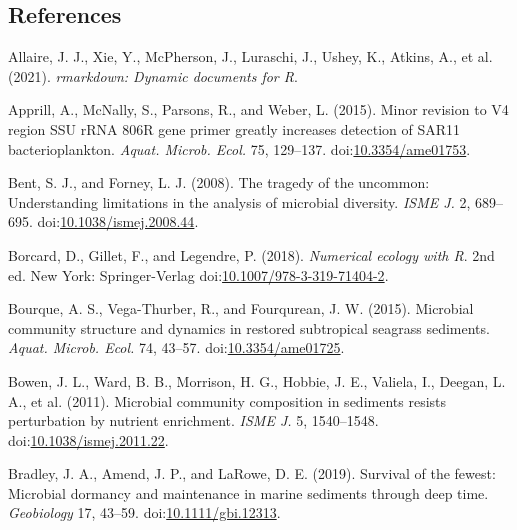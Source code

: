 \documentclass[12pt,]{article}
\begin{document}
\newpage

\newpage

\hypertarget{references}{%
\subsection{References}\label{references}}

 \setlength{\emergencystretch}{8.5em}

\hypertarget{refs}{}
\leavevmode\hypertarget{ref-Allaire2021}{}%
Allaire, J. J., Xie, Y., McPherson, J., Luraschi, J., Ushey, K., Atkins,
A., et al. (2021). \emph{rmarkdown: Dynamic documents for R}.

\leavevmode\hypertarget{ref-Apprill2015a}{}%
Apprill, A., McNally, S., Parsons, R., and Weber, L. (2015). Minor
revision to V4 region SSU rRNA 806R gene primer greatly increases
detection of SAR11 bacterioplankton. \emph{Aquat. Microb. Ecol.} 75,
129--137. doi:\href{https://doi.org/10.3354/ame01753}{10.3354/ame01753}.

\leavevmode\hypertarget{ref-Bent2008}{}%
Bent, S. J., and Forney, L. J. (2008). The tragedy of the uncommon:
Understanding limitations in the analysis of microbial diversity.
\emph{ISME J.} 2, 689--695.
doi:\href{https://doi.org/10.1038/ismej.2008.44}{10.1038/ismej.2008.44}.

\leavevmode\hypertarget{ref-Borcard2018}{}%
Borcard, D., Gillet, F., and Legendre, P. (2018). \emph{Numerical
ecology with R}. 2nd ed. New York: Springer-Verlag
doi:\href{https://doi.org/10.1007/978-3-319-71404-2}{10.1007/978-3-319-71404-2}.

\leavevmode\hypertarget{ref-Bourque2015}{}%
Bourque, A. S., Vega-Thurber, R., and Fourqurean, J. W. (2015).
Microbial community structure and dynamics in restored subtropical
seagrass sediments. \emph{Aquat. Microb. Ecol.} 74, 43--57.
doi:\href{https://doi.org/10.3354/ame01725}{10.3354/ame01725}.

\leavevmode\hypertarget{ref-Bowen2011a}{}%
Bowen, J. L., Ward, B. B., Morrison, H. G., Hobbie, J. E., Valiela, I.,
Deegan, L. A., et al. (2011). Microbial community composition in
sediments resists perturbation by nutrient enrichment. \emph{ISME J.} 5,
1540--1548.
doi:\href{https://doi.org/10.1038/ismej.2011.22}{10.1038/ismej.2011.22}.

\leavevmode\hypertarget{ref-Bradley2019}{}%
Bradley, J. A., Amend, J. P., and LaRowe, D. E. (2019). Survival of the
fewest: Microbial dormancy and maintenance in marine sediments through
deep time. \emph{Geobiology} 17, 43--59.
doi:\href{https://doi.org/10.1111/gbi.12313}{10.1111/gbi.12313}.
\end{document}
